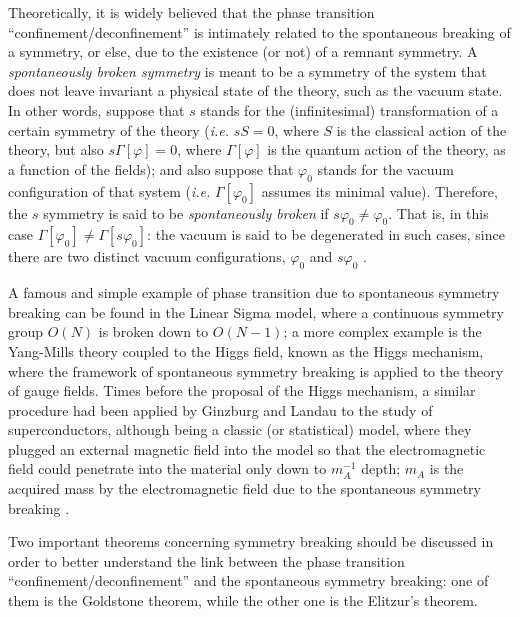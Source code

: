 Theoretically, it is widely believed that the phase transition ``confinement/deconfinement'' is
intimately related to the spontaneous breaking of a symmetry, or else, due to the existence (or
not) of a remnant symmetry. A {\it spontaneously broken symmetry} is meant to be a symmetry of
the system that does not leave invariant a physical state of the theory, such as the vacuum
state. In other words, suppose that $s$ stands for the (infinitesimal) transformation of a
certain symmetry of the theory ({\it i.e.} $sS=0$, where $S$ is the classical action of the
theory, but also $s\Gamma[\varphi]=0$, where $\Gamma[\varphi]$ is the quantum action of the
theory, as a function of the fields); and also suppose that $\varphi_{0}$ stands for the vacuum
configuration of that system ({\it i.e.} $\Gamma[\varphi_{0}]$ assumes its minimal value).
Therefore, the $s$ symmetry is said to be {\it spontaneously broken} if $s\varphi_{0} \neq
\varphi_{0}$. That is, in this case $\Gamma[\varphi_{0}] \neq \Gamma[s\varphi_{0}]$: the vacuum
is said to be degenerated in such cases, since there are two distinct vacuum configurations,
$\varphi_{0}$ and $s\varphi_{0}$ \cite{Weinberg:1996kr,Peskin:1995ev,Ryder:1985wq}.

A famous and simple example of phase transition due to spontaneous symmetry breaking can be
found in the Linear Sigma model, where a continuous symmetry group $O(N)$ is broken down to
$O(N-1)$; a more complex example is the Yang-Mills theory coupled to the Higgs field, known as
the Higgs mechanism, where the framework of spontaneous symmetry breaking is applied to the
theory of gauge fields. Times before the proposal of the Higgs mechanism, a similar procedure
had been applied by Ginzburg and Landau to the study of superconductors, although being a
classic (or statistical) model, where they plugged an external magnetic field into the model so
that the electromagnetic field could penetrate into the material only down to $m_{A}^{-1}$
depth; $m_{A}$ is the acquired mass by the electromagnetic field due to the spontaneous
symmetry breaking \cite{Weinberg:1996kr,Peskin:1995ev,Ryder:1985wq,Greensite:2011zz}. 

Two important theorems concerning symmetry breaking should be discussed in order to
better understand the link between the phase transition ``confinement/deconfinement'' and the
spontaneous symmetry breaking: one of them is the Goldstone theorem, while the other one is
the Elitzur's theorem.

